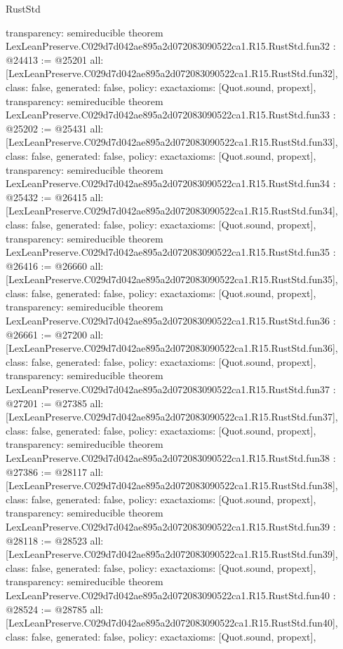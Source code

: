 \begin{lexlean}{RustStd}
\begin{coremodule}
{  transparency: semireducible
}
theorem LexLeanPreserve.C029d7d042ae895a2d072083090522ca1.R15.RustStd.fun32 : @24413 := @25201 {
  all: [LexLeanPreserve.C029d7d042ae895a2d072083090522ca1.R15.RustStd.fun32],
  class: false,
  generated: false,
  policy: exact{axioms: [Quot.sound, propext]},
  transparency: semireducible
}
theorem LexLeanPreserve.C029d7d042ae895a2d072083090522ca1.R15.RustStd.fun33 : @25202 := @25431 {
  all: [LexLeanPreserve.C029d7d042ae895a2d072083090522ca1.R15.RustStd.fun33],
  class: false,
  generated: false,
  policy: exact{axioms: [Quot.sound, propext]},
  transparency: semireducible
}
theorem LexLeanPreserve.C029d7d042ae895a2d072083090522ca1.R15.RustStd.fun34 : @25432 := @26415 {
  all: [LexLeanPreserve.C029d7d042ae895a2d072083090522ca1.R15.RustStd.fun34],
  class: false,
  generated: false,
  policy: exact{axioms: [Quot.sound, propext]},
  transparency: semireducible
}
theorem LexLeanPreserve.C029d7d042ae895a2d072083090522ca1.R15.RustStd.fun35 : @26416 := @26660 {
  all: [LexLeanPreserve.C029d7d042ae895a2d072083090522ca1.R15.RustStd.fun35],
  class: false,
  generated: false,
  policy: exact{axioms: [Quot.sound, propext]},
  transparency: semireducible
}
theorem LexLeanPreserve.C029d7d042ae895a2d072083090522ca1.R15.RustStd.fun36 : @26661 := @27200 {
  all: [LexLeanPreserve.C029d7d042ae895a2d072083090522ca1.R15.RustStd.fun36],
  class: false,
  generated: false,
  policy: exact{axioms: [Quot.sound, propext]},
  transparency: semireducible
}
theorem LexLeanPreserve.C029d7d042ae895a2d072083090522ca1.R15.RustStd.fun37 : @27201 := @27385 {
  all: [LexLeanPreserve.C029d7d042ae895a2d072083090522ca1.R15.RustStd.fun37],
  class: false,
  generated: false,
  policy: exact{axioms: [Quot.sound, propext]},
  transparency: semireducible
}
theorem LexLeanPreserve.C029d7d042ae895a2d072083090522ca1.R15.RustStd.fun38 : @27386 := @28117 {
  all: [LexLeanPreserve.C029d7d042ae895a2d072083090522ca1.R15.RustStd.fun38],
  class: false,
  generated: false,
  policy: exact{axioms: [Quot.sound, propext]},
  transparency: semireducible
}
theorem LexLeanPreserve.C029d7d042ae895a2d072083090522ca1.R15.RustStd.fun39 : @28118 := @28523 {
  all: [LexLeanPreserve.C029d7d042ae895a2d072083090522ca1.R15.RustStd.fun39],
  class: false,
  generated: false,
  policy: exact{axioms: [Quot.sound, propext]},
  transparency: semireducible
}
theorem LexLeanPreserve.C029d7d042ae895a2d072083090522ca1.R15.RustStd.fun40 : @28524 := @28785 {
  all: [LexLeanPreserve.C029d7d042ae895a2d072083090522ca1.R15.RustStd.fun40],
  class: false,
  generated: false,
  policy: exact{axioms: [Quot.sound, propext]},
}
\end{coremodule}
\end{lexlean}
